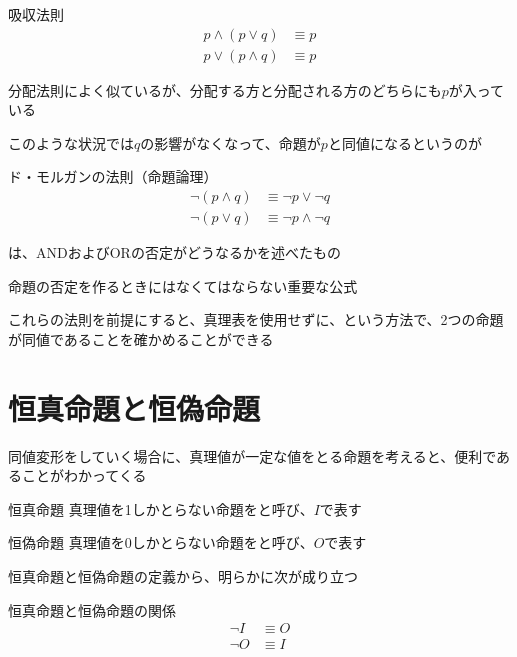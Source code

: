 \documentclass[b5paper,12pt]{jsarticle}
\begin{document}
\sectionline

\begin{theorem}{吸収法則}
  \begin{align*}
    p \land (p \lor q) & \equiv p \\
    p \lor (p \land q) & \equiv p
  \end{align*}
\end{theorem}

分配法則によく似ているが、分配する方と分配される方のどちらにも$p$が入っている

このような状況では$q$の影響がなくなって、命題が$p$と同値になるというのが

\sectionline

\begin{theorem}{ド・モルガンの法則（命題論理）}
  \begin{align*}
    \neg (p \land q) & \equiv \neg p \lor \neg q  \\
    \neg (p \lor q)  & \equiv \neg p \land \neg q
  \end{align*}
\end{theorem}

は、ANDおよびORの否定がどうなるかを述べたもの

命題の否定を作るときにはなくてはならない重要な公式

\sectionline

これらの法則を前提にすると、真理表を使用せずに、という方法で、2つの命題が同値であることを確かめることができる

\sectionline
\section{恒真命題と恒偽命題}

同値変形をしていく場合に、真理値が一定な値をとる命題を考えると、便利であることがわかってくる

\begin{definition}{恒真命題}
  真理値を1しかとらない命題をと呼び、$I$で表す
\end{definition}

\begin{definition}{恒偽命題}
  真理値を0しかとらない命題をと呼び、$O$で表す
\end{definition}

\sectionline

恒真命題と恒偽命題の定義から、明らかに次が成り立つ

\begin{theorem}{恒真命題と恒偽命題の関係}
  \begin{align*}
    \neg I & \equiv O \\
    \neg O & \equiv I
  \end{align*}
\end{theorem}
\end{document}
